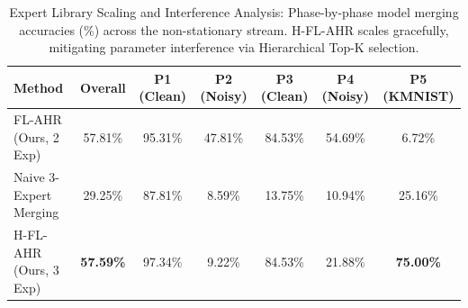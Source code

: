 \documentclass{article}
\theoremstyle{plain}
\theoremstyle{definition}
\theoremstyle{remark}
\begin{document}
\begin{table}[t]
\caption{Expert Library Scaling and Interference Analysis: Phase-by-phase model merging accuracies (\%) across the non-stationary stream. H-FL-AHR scales gracefully, mitigating parameter interference via Hierarchical Top-K selection.}
\label{hierarchical-scaling-table}
\vskip 0.04in
\begin{center}
\setlength{\tabcolsep}{3.5pt}
\begin{scriptsize}
\begin{tabular}{lcccccc}
\toprule
\textbf{Method} & \textbf{Overall} & \textbf{P1 (Clean)} & \textbf{P2 (Noisy)} & \textbf{P3 (Clean)} & \textbf{P4 (Noisy)} & \textbf{P5 (KMNIST)} \\
\midrule
FL-AHR (Ours, 2 Exp) & 57.81\% & 95.31\% & 47.81\% & 84.53\% & 54.69\% & 6.72\% \\
Naive 3-Expert Merging & 29.25\% & 87.81\% & 8.59\% & 13.75\% & 10.94\% & 25.16\% \\
H-FL-AHR (Ours, 3 Exp) & \textbf{57.59\%} & 97.34\% & 9.22\% & 84.53\% & 21.88\% & \textbf{75.00\%} \\
\bottomrule
\end{tabular}
\end{scriptsize}
\end{center}
\vspace*{-8pt}
\end{table}
\end{document}
